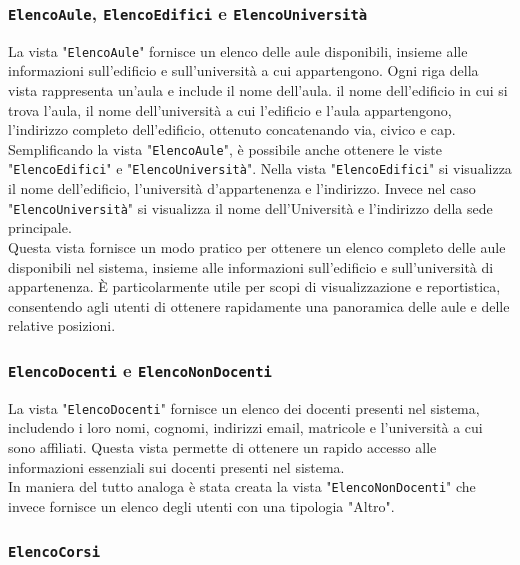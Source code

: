 \documentclass[a4paper, 10pt, oneside]{article} %
\begin{document}
\subsubsection*{\texttt{ElencoAule}, \texttt{ElencoEdifici}  e \texttt{ElencoUniversità}}

La vista "\texttt{ElencoAule}" fornisce un elenco delle aule disponibili, insieme alle informazioni sull'edificio e sull'università a cui appartengono. Ogni riga della vista rappresenta un'aula e include il nome dell'aula. il nome dell'edificio in cui si trova l'aula, il nome dell'università a cui l'edificio e l'aula appartengono, l'indirizzo completo dell'edificio, ottenuto concatenando via, civico e cap.\\

Semplificando la vista "\texttt{ElencoAule}", è possibile anche ottenere le viste "\texttt{ElencoEdifici}" e "\texttt{ElencoUniversità}". Nella vista "\texttt{ElencoEdifici}" si visualizza il nome dell'edificio, l'università d'appartenenza e l'indirizzo. Invece nel caso "\texttt{ElencoUniversità}" si visualizza il nome dell'Università e l'indirizzo della sede principale.\\


Questa vista fornisce un modo pratico per ottenere un elenco completo delle aule disponibili nel sistema, insieme alle informazioni sull'edificio e sull'università di appartenenza. È particolarmente utile per scopi di visualizzazione e reportistica, consentendo agli utenti di ottenere rapidamente una panoramica delle aule e delle relative posizioni.

\subsubsection*{\texttt{ElencoDocenti} e \texttt{ElencoNonDocenti}}

La vista "\texttt{ElencoDocenti}" fornisce un elenco dei docenti presenti nel sistema, includendo i loro nomi, cognomi, indirizzi email, matricole e l'università a cui sono affiliati. Questa vista permette di ottenere un rapido accesso alle informazioni essenziali sui docenti presenti nel sistema.\\

In maniera del tutto analoga è stata creata la vista "\texttt{ElencoNonDocenti}" che invece fornisce un elenco degli utenti con una tipologia "Altro".

\subsubsection*{\texttt{ElencoCorsi}}
\end{document}
